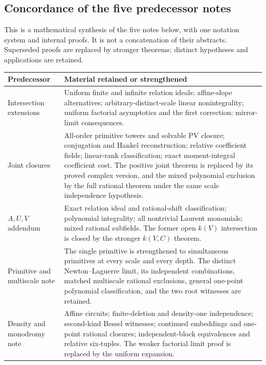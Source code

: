\documentclass[11pt]{article}
\theoremstyle{definition}
\theoremstyle{remark}
\begin{document}
\subsection{Concordance of the five predecessor notes}
This is a mathematical synthesis of the five notes below, with one
notation system and internal proofs. It is not a concatenation of their
abstracts. Superseded proofs are replaced by stronger theorems; distinct
hypotheses and applications are retained.
\begin{longtable}{@{}>{\raggedright\arraybackslash}p{}>{\raggedright\arraybackslash}p{}@{}}
\toprule
Predecessor & Material retained or strengthened \\
\midrule
\endhead
Intersection extensions \cite{Extensions} &
Uniform finite and infinite relation ideals; affine-slope alternatives;
arbitrary-distinct-scale linear nonintegrality; uniform factorial
asymptotics and the first correction; mirror-limit consequences. \\
\addlinespace
Joint closures \cite{Joint} &
All-order primitive towers and solvable PV closure; conjugation and
Hankel reconstruction; relative coefficient fields; linear-rank
classification; exact moment-integral coefficient cost. The positive
joint theorem is replaced by its proved complex version, and the mixed
polynomial exclusion by the full rational theorem under the same scale
independence hypothesis. \\
\addlinespace
$A,U,V$ addendum \cite{AUV} &
Exact relation ideal and rational-shift classification; polynomial
integrality; all nontrivial Laurent monomials; mixed rational subfields.
The former open $k(V)$ intersection is closed by the stronger
$k(V,C)$ theorem. \\
\addlinespace
Primitive and multiscale note \cite{Primitive} &
The single primitive is strengthened to simultaneous primitives at every
scale and every depth. The distinct Newton--Laguerre limit, its independent combinations,
matched multiscale rational exclusions, general one-point polynomial
classification, and the two root witnesses are retained. \\
\addlinespace
Density and monodromy note \cite{Density} &
Affine circuits; finite-deletion and density-one independence;
second-kind Bessel witnesses; continued embeddings and one-point
rational closures; independent-block equivalences and relative six-tuples.
The weaker factorial limit proof is replaced by the uniform expansion. \\
\bottomrule
\end{longtable}
\end{document}
